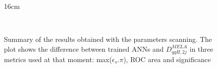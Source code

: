 \begin{figure}[hbtp]{16cm}
	\caption{Summary of the results obtained with the parameters scanning. The plot shows the difference between trained ANNs and $D_{qqH,2j}^{MELA}$ in three metrics used at that moment: max($\epsilon_{s}.\pi$), ROC area and significance}
	\centering
	\\

\end{figure}
